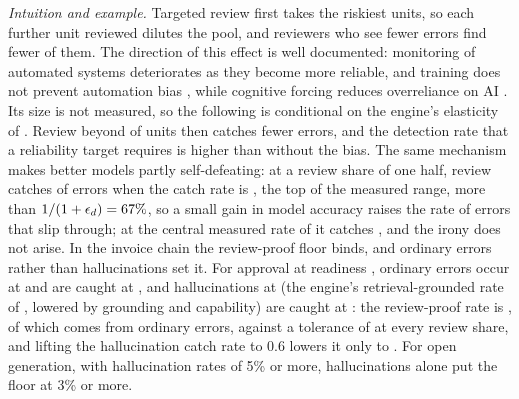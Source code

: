\noindent\emph{Intuition and example.} Targeted review first takes the riskiest units, so each further unit reviewed dilutes the pool, and reviewers who see fewer errors find fewer of them. The direction of this effect is well documented: monitoring of automated systems deteriorates as they become more reliable, and training does not prevent automation bias \citep{parasuraman1993performance,bailey2007automation,parasuraman2010complacency}, while cognitive forcing reduces overreliance on AI \citep{bucinca2021trust}. Its size is not measured, so the following is conditional on the engine's elasticity of \icEpsd. Review beyond \icBiasPeak{} of units then catches fewer errors, and the detection rate that a reliability target requires is \icBiasUplift{} higher than without the bias. The same mechanism makes better models partly self-defeating: at a review share of one half, review catches \icBiasTop{} of errors when the catch rate is \icDRhigh, the top of the measured range, more than $1/(1+\epsilon_d)=67\%$, so a small gain in model accuracy raises the rate of errors that slip through; at the central measured rate of \icDR{} it catches \icBiasCentral, and the irony does not arise. In the invoice chain the review-proof floor binds, and ordinary errors rather than hallucinations set it. For approval at readiness \icIotaHigh, ordinary errors occur at \icHalEo{} and are caught at \icDR, and hallucinations at \icHalEh{} (the engine's retrieval-grounded rate of \icHret, lowered by grounding and capability) are caught at \icDh: the review-proof rate is \icHalFloor, of which \icHalFloorO{} comes from ordinary errors, against a tolerance of \icHalTol{} at every review share, and lifting the hallucination catch rate to 0.6 lowers it only to \icHalFloorDh. For open generation, with hallucination rates of 5\% or more, hallucinations alone put the floor at 3\% or more.

